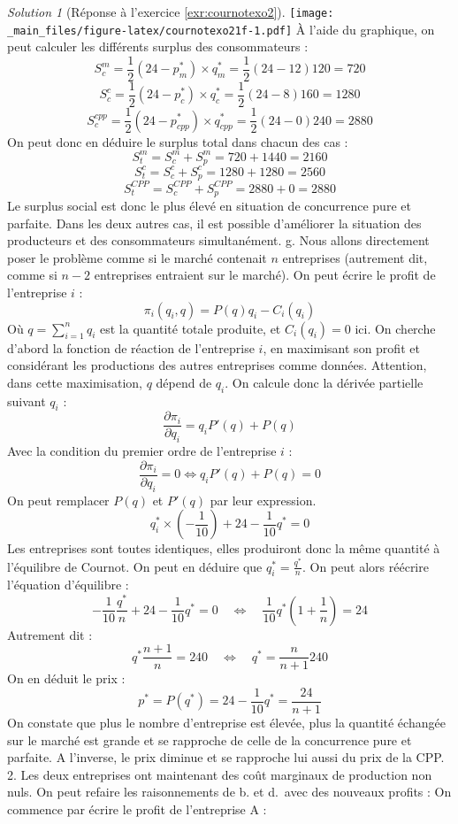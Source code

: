 \documentclass[
]{book}
\theoremstyle{definition}
\theoremstyle{definition}
\theoremstyle{definition}
\theoremstyle{definition}
\theoremstyle{remark}
\newtheorem*{solution}{Solution}
\begin{document}
\begin{solution}[Réponse à l'exercice \ref{exr:cournotexo2}]
\texttt{[image: \_main\_files/figure-latex/cournotexo21f-1.pdf]}
À l'aide du graphique, on peut calculer les différents surplus des consommateurs :
\[S_c^m=\frac{1}{2}(24-p_m^*)\times q_m^*=\frac{1}{2}(24-12)120=720\]
\[S_c^c=\frac{1}{2}(24-p_c^*)\times q_c^*=\frac{1}{2}(24-8)160=1280\]
\[S_c^{cpp}=\frac{1}{2}(24-p_{cpp}^*)\times q_{cpp}^*=\frac{1}{2}(24-0)240=2880\]
On peut donc en déduire le surplus total dans chacun des cas :
\[S_t^m=S_c^m+S_p^m=720+1440=2160\]
\[S_t^c=S_c^c+S_p^c=1280+1280=2560\]
\[S_t^{CPP}=S_c^{CPP}+S_p^{CPP}=2880+0=2880\]
Le surplus social est donc le plus élevé en situation de concurrence pure et parfaite.
Dans les deux autres cas, il est possible d'améliorer la situation des producteurs et des consommateurs simultanément.
g. Nous allons directement poser le problème comme si le marché contenait \(n\) entreprises (autrement dit, comme si \(n-2\) entreprises entraient sur le marché).
On peut écrire le profit de l'entreprise \(i\) :
\[\pi_i(q_i, q)=P(q)q_i-C_i(q_i)\]
Où \(q=\sum_{i=1}^nq_i\) est la quantité totale produite, et \(C_i(q_i)=0\) ici.
On cherche d'abord la fonction de réaction de l'entreprise \(i\), en maximisant son profit et considérant les productions des autres entreprises comme données.
Attention, dans cette maximisation, \(q\) dépend de \(q_i\).
On calcule donc la dérivée partielle suivant \(q_i\) :
\[\frac{\partial \pi_i}{\partial q_i}=q_iP'(q)+P(q)\]
Avec la condition du premier ordre de l'entreprise \(i\) :
\[\frac{\partial \pi_i}{\partial q_i}=0 \Leftrightarrow q_iP'(q)+P(q)=0\]
On peut remplacer \(P(q)\) et \(P'(q)\) par leur expression.
\[q_i^*\times\left(-\frac{1}{10}\right)+24-\frac{1}{10}q^*=0\]
Les entreprises sont toutes identiques, elles produiront donc la même quantité à l'équilibre de Cournot.
On peut en déduire que \(q_i^*=\frac{q^*}{n}\).
On peut alors réécrire l'équation d'équilibre :
\[-\frac{1}{10}\frac{q^*}{n}+24-\frac{1}{10}q^*=0\quad\Leftrightarrow \quad \frac{1}{10}q^*\left(1+\frac{1}{n}\right)=24\]
Autrement dit :
\[q^*\frac{n+1}{n}=240\quad\Leftrightarrow\quad q^*=\frac{n}{n+1}240\]
On en déduit le prix :
\[p^*=P(q^*)=24-\frac{1}{10}q^*=\frac{24}{n+1}\]
On constate que plus le nombre d'entreprise est élevée, plus la quantité échangée sur le marché est grande et se rapproche de celle de la concurrence pure et parfaite.
A l'inverse, le prix diminue et se rapproche lui aussi du prix de la CPP.
2. Les deux entreprises ont maintenant des coût marginaux de production non nuls.
On peut refaire les raisonnements de b. et d.~avec des nouveaux profits :
On commence par écrire le profit de l'entreprise A :

\end{solution}
\end{document}
